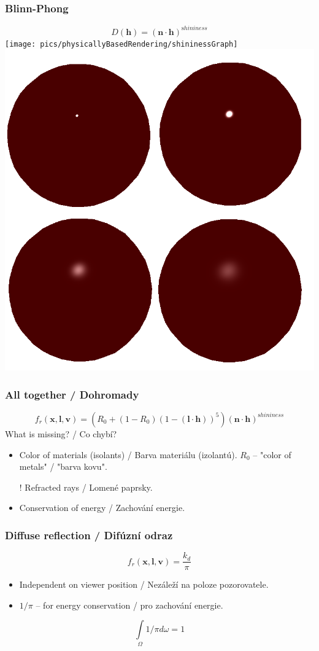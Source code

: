 \begin{frame}\frametitle{Blinn-Phong}
    \begin{equation*}
        D(\mathbf h) = (\mathbf n \cdot \mathbf h)^{\mathrm shininess}
    \end{equation*}
    \texttt{[image: pics/physicallyBasedRendering/shininessGraph]}
    \includegraphics[width=.5\textwidth]{pics/physicallyBasedRendering/shininess.png}
\end{frame}

\begin{frame}\frametitle{All together / Dohromady}
    \begin{equation*}
        f_r(\mathbf x, \mathbf l, \mathbf v) = (R_0 + (1-R_0)(1-(\mathbf l \cdot \mathbf h))^5)(\mathbf n \cdot \mathbf h)^{\mathrm shininess}
    \end{equation*}
    What is missing? / Co chybí?
    \begin{itemize}
      \item Color of materials (isolants) / Barva materiálu (izolantú). $R_0$ -- "color of metals" / "barva kovu".
        \item[!] Refracted rays / Lomené paprsky.
        \item Conservation of energy / Zachování energie.
    \end{itemize}
\end{frame}

\begin{frame}\frametitle{Diffuse reflection / Difúzní odraz}
    \begin{equation*}
        f_r(\mathbf x, \mathbf l, \mathbf v) = \frac{k_d}{\pi}
    \end{equation*}
    \begin{itemize}
        \item Independent on viewer position / Nezáleží na poloze pozorovatele.
        \item $1/\pi$ -- for energy conservation / pro zachování energie.
    \end{itemize}
    \begin{equation*}
        \int\limits_\Omega 1/\pi d\omega = 1
    \end{equation*}
\end{frame}

